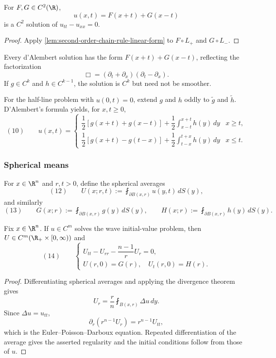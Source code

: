 \begin{theorem}
\label{thm:wave-1d-general-solution}
\leanok
For $F,G\in C^2(\R)$,
$$u(x,t)=F(x+t)+G(x-t)$$
is a $C^2$ solution of $u_{tt}-u_{xx}=0$.
\end{theorem}
\begin{proof}
\leanok
\sketch Apply \cref{lem:second-order-chain-rule-linear-form} to
$F\circ L_+$ and $G\circ L_-$.
\end{proof}

\begin{remark}
\label{rem:wave-equation-general-solution-1d}
Every d'Alembert solution has the form $F(x+t)+G(x-t)$, reflecting the
factorization
$$\Box=(\partial_t+\partial_x)(\partial_t-\partial_x).$$
If $g\in C^k$ and $h\in C^{k-1}$, the solution is $C^k$ but need not be
smoother.
\end{remark}

For the half-line problem with $u(0,t)=0$, extend $g$ and $h$ oddly to
$\widetilde g$ and $\widetilde h$. D'Alembert's formula yields, for $x,t\ge0$,
$$(10)\qquad
u(x,t)=
\begin{cases}
\dfrac12[g(x+t)+g(x-t)]+\dfrac12\displaystyle\int_{x-t}^{x+t}h(y)\,dy
&x\ge t,\\[8pt]
\dfrac12[g(x+t)-g(t-x)]+\dfrac12\displaystyle\int_{t-x}^{t+x}h(y)\,dy
&x\le t.
\end{cases}$$

\subsubsection{Spherical means}
\label{sec:wave-spherical-means}

For $x\in\R^n$ and $r,t>0$, define the spherical averages
$$(12)\qquad U(x;r,t):=\fint_{\partial B(x,r)}u(y,t)\,dS(y),$$
and similarly
$$(13)\qquad
G(x;r):=\fint_{\partial B(x,r)}g(y)\,dS(y),
\qquad
H(x;r):=\fint_{\partial B(x,r)}h(y)\,dS(y).$$

\begin{lemma}
\label{lem:euler-poisson-darboux-equation}
Fix $x\in\R^n$. If $u\in C^m$ solves the wave initial-value problem, then
$U\in C^m(\R_+\times[0,\infty))$ and
$$(14)\qquad
\begin{cases}
U_{tt}-U_{rr}-\dfrac{n-1}{r}U_r=0,\\
U(r,0)=G(r),\quad U_t(r,0)=H(r).
\end{cases}$$
\end{lemma}
\begin{proof}
\sketch Differentiating spherical averages and applying the divergence theorem
gives
$$U_r=\frac r n\fint_{B(x,r)}\Delta u\,dy.$$
Since $\Delta u=u_{tt}$,
$$\partial_r(r^{n-1}U_r)=r^{n-1}U_{tt},$$
which is the Euler--Poisson--Darboux equation. Repeated differentiation of the
average gives the asserted regularity and the initial conditions follow from
those of $u$.
\end{proof}

